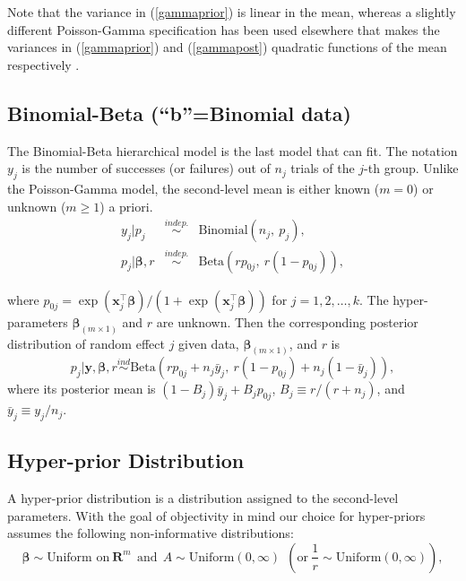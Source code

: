 \documentclass[article]{jss}
\begin{document}
Note that the variance in (\ref{gammaprior}) is linear in the mean, whereas a slightly different Poisson-Gamma specification has been used elsewhere \citep{1997} that makes the variances in (\ref{gammaprior}) and (\ref{gammapost}) quadratic functions of the mean respectively .

\subsection[Binomial-Beta]{Binomial-Beta (``b''=Binomial data)}
The Binomial-Beta hierarchical model is the last model that  can fit. The notation $y_{j}$ is the number of successes (or failures) out of $n_{j}$ trials of the $j$-th group. Unlike the Poisson-Gamma model, the second-level mean is either known ($m=0$) or unknown ($m\ge1$) a priori.
\begin{eqnarray}
y_{j} \vert p_{j} &\stackrel{indep.}{\sim}& \textrm{Binomial}(n_{j}, ~p_{j}),\\
p_{j} \vert \boldsymbol{\beta}, r &\stackrel{indep.}{\sim}&\textrm{Beta}(rp_{0j},~ r(1-p_{0j})),
\end{eqnarray}

where $p_{0j}=\exp(\boldsymbol{x}_j^\top\boldsymbol{\beta})/(1+\exp(\boldsymbol{x}_j^\top\boldsymbol{\beta}))$ for $j=1, 2, \ldots, k$. The hyper-parameters $\boldsymbol{\beta}_{(m\times1)}$ and $r$ are unknown. Then the corresponding posterior distribution of random effect $j$ given  data, $\boldsymbol{\beta}_{(m\times1)}$, and $r$ is
\begin{equation} \label{betapost}
p_{j}\vert \boldsymbol{y}, \boldsymbol{\beta}, r \stackrel{ind}{\sim}\textrm{Beta}(rp_{0j}+n_{j}\bar{y}_{j},~r(1-p_{0j})+n_{j}(1-\bar{y}_{j})),
\end{equation}
where its posterior mean is $(1-B_{j})\bar{y}_{j}+B_{j}p_{0j}$, $B_{j}\equiv r/ (r+n_{j})$, and $\bar{y}_{j}\equiv y_{j} / n_{j}$.


\subsection[Hyper-prior distribution]{Hyper-prior Distribution}
A hyper-prior distribution is a distribution assigned to the second-level parameters. With the goal of objectivity in mind our choice for hyper-priors assumes the following non-informative distributions:
\begin{equation}
  \label{eq:hyper}
\boldsymbol{\beta} \sim \textrm{Uniform on}~ \boldsymbol{R}^{m}~~\textrm{and}~~A \sim \textrm{Uniform}(0, \infty) ~~(\textrm{or} ~\frac{1}{r}\sim \textrm{Uniform}(0, \infty)),
\end{equation}
\end{document}

